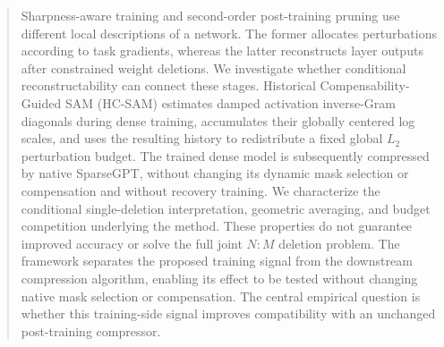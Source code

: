 \begin{abstract}
Sharpness-aware training and second-order post-training pruning use different local descriptions of a network. The former allocates perturbations according to task gradients, whereas the latter reconstructs layer outputs after constrained weight deletions. We investigate whether conditional reconstructability can connect these stages. Historical Compensability-Guided SAM (HC-SAM) estimates damped activation inverse-Gram diagonals during dense training, accumulates their globally centered log scales, and uses the resulting history to redistribute a fixed global $L_2$ perturbation budget. The trained dense model is subsequently compressed by native SparseGPT, without changing its dynamic mask selection or compensation and without recovery training. We characterize the conditional single-deletion interpretation, geometric averaging, and budget competition underlying the method. These properties do not guarantee improved accuracy or solve the full joint $N{:}M$ deletion problem. The framework separates the proposed training signal from the downstream compression algorithm, enabling its effect to be tested without changing native mask selection or compensation. The central empirical question is whether this training-side signal improves compatibility with an unchanged post-training compressor.
\end{abstract}
